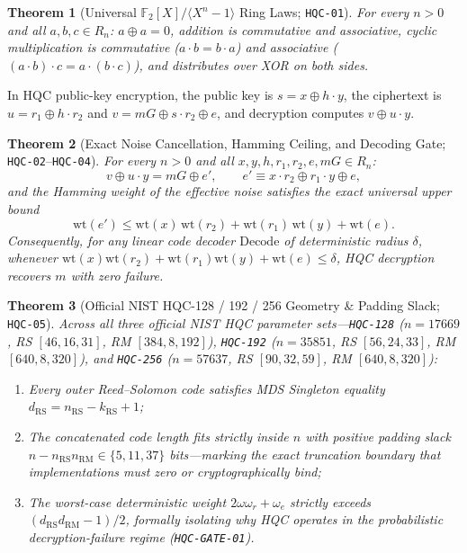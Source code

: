 \documentclass[11pt,a4paper]{article}
\theoremstyle{plain}
\newtheorem{theorem}{Theorem}[section]
\theoremstyle{remark}
\newcommand{\code}[1]{\texttt{\small #1}}
\newcommand{\Ftwo}{\mathbb{F}_2}
\newcommand{\wt}{\mathrm{wt}}
\begin{document}
\begin{theorem}[Universal {$\Ftwo[X]/\langle X^n-1\rangle$} Ring Laws; \code{HQC-01}]
For every $n > 0$ and all $a,b,c \in R_n$: $a \oplus a = 0$, addition is commutative and associative, cyclic multiplication is commutative ($a\cdot b = b\cdot a$) and associative ($(a\cdot b)\cdot c = a\cdot(b\cdot c)$), and distributes over XOR on both sides.
\end{theorem}

In HQC public-key encryption, the public key is $s = x \oplus h\cdot y$, the ciphertext is $u = r_1 \oplus h\cdot r_2$ and $v = mG \oplus s\cdot r_2 \oplus e$, and decryption computes $v \oplus u\cdot y$.

\begin{theorem}[Exact Noise Cancellation, Hamming Ceiling, and Decoding Gate; \code{HQC-02}--\code{HQC-04}]
For every $n > 0$ and all $x,y,h,r_1,r_2,e,mG \in R_n$:
\begin{equation}
  v \oplus u\cdot y = mG \oplus e', \qquad e' \equiv x\cdot r_2 \oplus r_1\cdot y \oplus e,
\end{equation}
and the Hamming weight of the effective noise satisfies the exact universal upper bound
\begin{equation}
  \wt(e') \le \wt(x)\,\wt(r_2) + \wt(r_1)\,\wt(y) + \wt(e).
\end{equation}
Consequently, for any linear code decoder $\mathrm{Decode}$ of deterministic radius $\delta$, whenever $\wt(x)\wt(r_2) + \wt(r_1)\wt(y) + \wt(e) \le \delta$, HQC decryption recovers $m$ with zero failure.
\end{theorem}

\begin{theorem}[Official NIST HQC-128 / 192 / 256 Geometry \& Padding Slack; \code{HQC-05}]
Across all three official NIST HQC parameter sets—\code{HQC-128} ($n=17669$, RS $[46,16,31]$, RM $[384,8,192]$), \code{HQC-192} ($n=35851$, RS $[56,24,33]$, RM $[640,8,320]$), and \code{HQC-256} ($n=57637$, RS $[90,32,59]$, RM $[640,8,320]$):
\begin{enumerate}
  \item Every outer Reed--Solomon code satisfies MDS Singleton equality $d_{\mathrm{RS}} = n_{\mathrm{RS}} - k_{\mathrm{RS}} + 1$;
  \item The concatenated code length fits strictly inside $n$ with positive padding slack $n - n_{\mathrm{RS}}n_{\mathrm{RM}} \in \{5, 11, 37\}$ bits—marking the exact truncation boundary that implementations must zero or cryptographically bind;
  \item The worst-case deterministic weight $2\omega\omega_r + \omega_e$ strictly exceeds $(d_{\mathrm{RS}}d_{\mathrm{RM}}-1)/2$, formally isolating why HQC operates in the probabilistic decryption-failure regime (\code{HQC-GATE-01}).
\end{enumerate}
\end{theorem}
\end{document}
